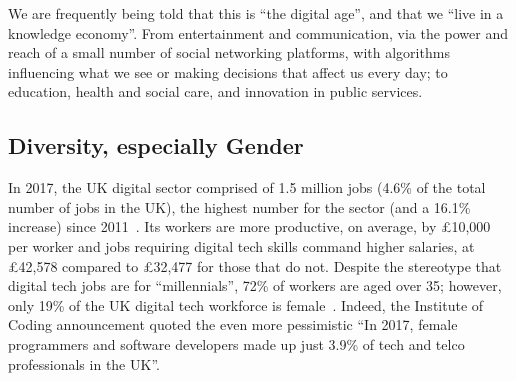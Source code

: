 \documentclass[sigconf]{acmart}
\begin{document}
We are frequently being told that this is ``the digital age'', and
that we ``live in a knowledge economy''. %
From entertainment and communication, via the power
and reach of a small number of social networking platforms, with algorithms
influencing what we see or making decisions that affect us every day;
to education, health and social care, and innovation in public
services.%

\subsection{Diversity, especially Gender}\label{sec:Gender}

In 2017, the UK digital sector comprised of 1.5 million jobs (4.6\% of
the total number of jobs in the UK), the highest number for the sector
(and a 16.1\% increase) since 2011~\cite{dcms:2017}. Its workers are
more productive, on average, by \pounds10,000 per worker and jobs
requiring digital tech skills command higher salaries, at
\pounds42,578 compared to \pounds32,477 for those that do not. Despite
the stereotype that digital tech jobs are for ``millennials'', 72\% of
workers are aged over 35; however, only 19\% of the UK digital tech
workforce is female~\cite{technation:2018}. Indeed, the Institute of
Coding announcement \cite{DfE2018a} quoted the even more pessimistic
``In 2017, female programmers and software developers made up just 3.9\% of tech and telco professionals in the UK''.
\end{document}
